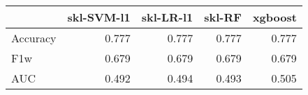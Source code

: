 \begin{tabular}{lrrrr}
\toprule
{} &  skl-SVM-l1 &  skl-LR-l1 &  skl-RF &  xgboost \\
\midrule
Accuracy &       0.777 &      0.777 &   0.777 &    0.777 \\
F1w      &       0.679 &      0.679 &   0.679 &    0.679 \\
AUC      &       0.492 &      0.494 &   0.493 &    0.505 \\
\bottomrule
\end{tabular}
